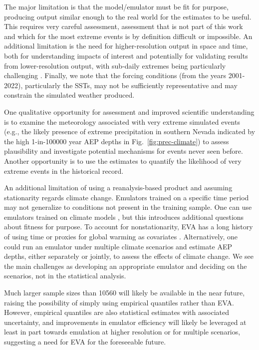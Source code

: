 \documentclass{ametsocV6.1}
\begin{document}
The major limitation is that the model/emulator must be fit for purpose, producing output similar enough to the real world for the estimates to be useful. This requires very careful assessment, assessment that is not part of this work and which for the most extreme events is by definition difficult or impossible. An additional limitation is the need for higher-resolution output in space and time, both for understanding impacts of interest and potentially for validating results from lower-resolution output, with sub-daily extremes being particularly challenging \citep{nasem2024pmp}. Finally, we note that the forcing conditions (from the years 2001-2022), particularly the SSTs, may not be sufficiently representative and may constrain the simulated weather produced.

One qualitative opportunity for assessment and improved scientific understanding  is to examine the meteorology associated with very extreme simulated events (e.g., the likely presence of extreme precipitation in southern Nevada indicated by the high 1-in-100000 year AEP depths in Fig.\ \ref{fig:prec-climate}) to assess plausibility and investigate potential mechanisms for events never seen before. Another opportunity is to use the estimates to quantify the likelihood of very extreme events in the historical record.

An additional limitation of using a reanalysis-based product and assuming stationarity regards climate change. Emulators trained on a specific time period may not generalize to conditions not present in the training sample. One can use emulators trained on climate models \citep[e.g.,][]{watt2025ace2}, but this introduces additional questions about fitness for purpose. To account for nonstationarity, EVA has a long history of using time or proxies for global warming as covariates \citep{coles2001introduction,westra2013global,risser2019probabilistic}. Alternatively, one could run an emulator under multiple climate scenarios and estimate AEP depths, either separately or jointly, to assess the effects of climate change. We see the main challenges as developing an appropriate emulator and deciding on the scenarios, not in the statistical analysis.

Much larger sample sizes than 10560 will likely be available in the near future, raising the possibility of simply using empirical quantiles rather than EVA. However, empirical quantiles are also statistical estimates with associated uncertainty, and improvements in emulator efficiency will likely be leveraged at least in part towards emulation at higher resolution or for multiple scenarios, suggesting a need for EVA for the foreseeable future.
\end{document}

